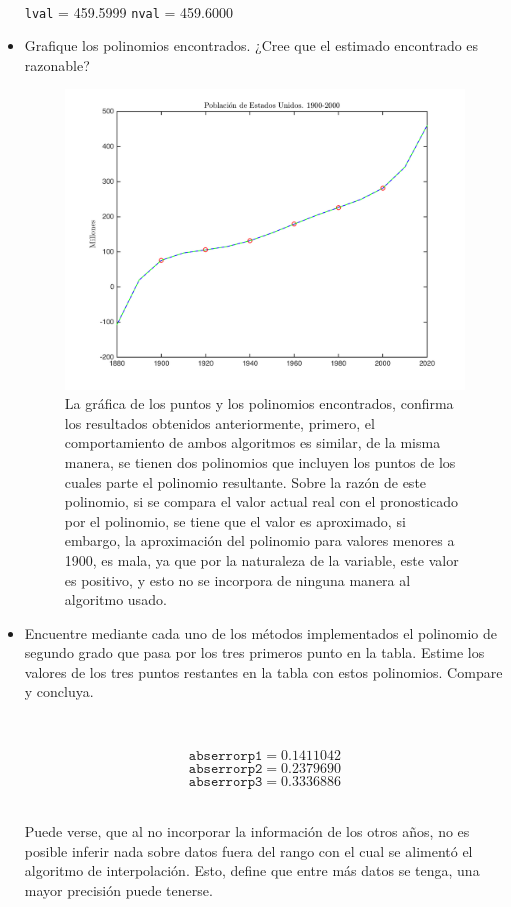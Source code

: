 \documentclass[11pt, spanish]{article}
\begin{document}
\begin{itemize}
\

\texttt{lval} = 459.5999 \qquad
\texttt{nval} = 459.6000

\item Grafique los polinomios encontrados. ¿Cree que el estimado encontrado es razonable?

\begin{figure}[H]
\centering
	\includegraphics[scale=0.8]{data/img/populationinterplot}
	\caption{La gráfica de los puntos y los polinomios encontrados, confirma los resultados obtenidos anteriormente, primero, el comportamiento de ambos algoritmos es similar, de la misma manera, se tienen dos polinomios que incluyen los puntos de los cuales parte el polinomio resultante. Sobre la razón de este polinomio, si se compara el valor actual real con el pronosticado por el polinomio, se tiene que el valor es aproximado, si embargo, la aproximación del polinomio para valores menores a 1900, es mala, ya que por la naturaleza de la variable, este valor es positivo, y esto no se incorpora de ninguna manera al algoritmo usado.}
\end{figure}

\item Encuentre mediante cada uno de los métodos implementados el polinomio de segundo grado que pasa por los tres primeros punto en la tabla. Estime los valores de los tres puntos restantes en la tabla con estos polinomios. Compare y concluya.

\

$$\texttt{abserrorp1} = 0.1411042$$
$$\texttt{abserrorp2} = 0.2379690$$
$$\texttt{abserrorp3} = 0.3336886$$\

Puede verse, que al no incorporar la información de los otros años, no es posible inferir nada sobre datos fuera del rango con el cual se alimentó el algoritmo de interpolación. Esto, define que entre más datos se tenga, una mayor precisión puede tenerse.

\end{itemize}
\end{document}
